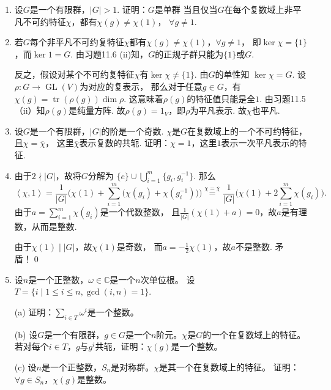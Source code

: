 \begin{enumerate}
        \item[12.1] 设$G$是一个有限群，$|G|>1$. 证明：$G$是单群
        当且仅当$G$在每个复数域上非平凡不可约特征$\chi$，都有$\chi(g)\ne\chi(1)$，
        $\forall g\ne1$.

        \item[\textbf{证明:}]
        若$G$每个非平凡不可约复特征$\chi$都有$\chi(g)\ne\chi(1)$，$\forall g\ne1$，
        即$\ker\chi=\{1\}$，而$\ker1=G$. 由习题11.6 (ii)知，$G$的正规子群只能为$\{1\}$或$G$.

        反之，假设对某个不可约复特征$\chi$有$\ker\chi\ne\{1\}$. 由$G$的单性知
        $\ker\chi=G$. 设$\rho:G \to \operatorname{GL}(V)$为对应的复表示，
        那么对于任意$g \in G$，有$\chi(g) = \operatorname{tr}(\rho(g)) 
        \dim \rho$. 这意味着$\rho(g)$的特征值只能是全$1$. 由习题11.5（ii）知$\rho(g)$是纯量方阵. 
        故$\rho(g) = 1_{V}$，即$\rho$为平凡表示. 故$\chi$也平凡.

        \item[12.2] 设$G$是一个有限群，$|G|$的阶是一个奇数.
        $\chi$是$G$在复数域上的一个不可约特征，且$\chi = \overline{\chi}$，
        这里$\overline{\chi}$表示复数的共轭.
        证明：$\chi = 1$，这里$1$表示一次平凡表示的特征.
        \item[\textbf{证明:}]
        由于$2 \nmid |G|$，故将$G$分解为
        $\{e\} \cup \bigcup\limits_{i=1}^{m}\{g_{i},g_{i}^{-1}\}$.
        那么
        \[\left<\chi,1\right> 
        = \frac{1}{|G|}\Big(\chi(1) + \sum_{i=1}^{m}\big(\chi(g_{i}) 
        + \chi(g_{i}^{-1})\big)\Big)
        \overset{\chi = \overline{\chi}}=  
        \frac{1}{|G|}\big(\chi(1) + 2\sum_{i=1}^{m}\chi(g_{i})\big).\]
        由于$a = \sum\limits_{i=1}^{m}\chi(g_{i})$是一个代数整数，
        且$\frac{1}{|G|}(\chi(1) + a) = 0$，故$a$是有理数，从而是整数.

        由于$\chi(1) \mid |G|$，故$\chi(1)$是奇数，
        而$a = -\frac{1}{2}\chi(1)$，故$a$不是整数. 矛盾！\qed

        \item[12.3] 设$n$是一个正整数，$\omega\in\mathbb{C}$是一个$n$次单位根。
        设$T=\{i\mid1\le i\le n,\gcd(i,n)=1\}$.

        (a) 证明：$\displaystyle \sum_{i\in T}\omega^i$是一个整数。

        (b) 设$G$是一个有限群，$g\in G$是一个$n$阶元。$\chi$是$G$的一个在复数域上的特征。
        若对每个$i\in T$，$g$与$g^i$共轭，证明：$\chi(g)$是一个整数。

        (c) 设$n$是一个正整数，$S_n$是对称群。$\chi$是其一个在复数域上的特征。
        证明：$\forall g\in S_n$，$\chi(g)$是整数。


\end{enumerate}
